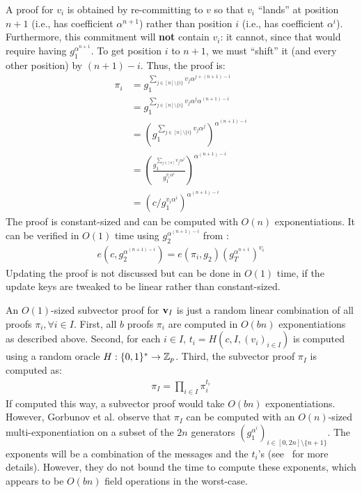 A proof for $v_i$ is obtained by re-committing to $v$ so that $v_i$ ``lands'' at position $n+1$ (i.e., has coefficient $\alpha^{n+1}$) rather than position $i$ (i.e., has coefficient $\alpha^i$).
Furthermore, this commitment will \textbf{not} contain $v_i$: it cannot, since that would require having $g_1^{\alpha^{n+1}}$.
To get position $i$ to $n+1$, we must ``shift'' it (and every other position) by $(n + 1) - i$.
Thus, the proof is:
\begin{align}
\pi_i &= g_1^{\sum_{j\in[n]\setminus\{i\}} v_j \alpha^{j + (n+1) - i}}\\
      &= g_1^{\sum_{j\in[n]\setminus\{i\}} v_j \alpha^{j} \alpha^{(n+1) - i}}\\
      &= \left(g_1^{\sum_{j\in[n]\setminus\{i\}} v_j \alpha^{j}}\right)^{\alpha^{(n+1) - i}}\\
      &= \left(\frac{g_1^{\sum_{j\in[n]} v_j \alpha^{j}}}{g_1^{v_i \alpha^i}}\right)^{\alpha^{(n+1) - i}}\\
      &= (c / g_1^{v_i \alpha^i})^{\alpha^{(n+1) - i}}
\end{align}
The proof is constant-sized and can be computed with $O(n)$ exponentiations.
It can be verified in $O(1)$ time using $g_2^{\alpha^{(n+1) - i}}$ from \vrk:
\begin{align}
e(c, g_2^{\alpha^{(n+1)-i}})=e(\pi_i, g_2) \left(g_T^{\alpha^{n+1}}\right)^{v_i}
\end{align}
Updating the proof is not discussed but can be done in $O(1)$ time, if the update keys are tweaked to be linear rather than constant-sized.

An $O(1)$-sized subvector proof for $\bm{\mathrm{v}}_I$ is just a random linear combination of all proofs $\pi_i,\forall i\in I$.
First, all $b$ proofs $\pi_i$ are computed in $O(bn)$ exponentiations as described above.
Second, for each $i\in I$, $t_i = H(c, I, (v_i)_{i\in I})$ is computed using a random oracle $H : \{0,1\}^*\rightarrow \mathbb{Z}_p$.
Third, the subvector proof $\pi_I$ is computed as:
\begin{align}
\pi_I = \prod_{i\in I} \pi_i^{t_i}
\end{align}
If computed this way, a subvector proof would take $O(bn)$ exponentiations.
However, Gorbunov et al. observe that $\pi_I$ can be computed with an $O(n)$-sized multi-exponentiation on a subset of the $2n$ generators $(g_1^{\alpha^i})_{i\in[0,2n]\setminus \{n+1\}}$.
The exponents will be a combination of the messages and the $t_i$'s (see~\cite[Sec 4.1]{GRWZ20} for more details).
However, they do not bound the time to compute these exponents, which appears to be $O(bn)$ field operations in the worst-case.


